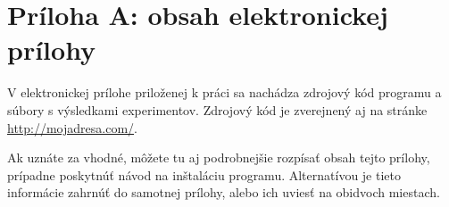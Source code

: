 \chapter*{Príloha A: obsah elektronickej prílohy}

\label{pri:softver} %

V elektronickej prílohe priloženej k práci sa nachádza zdrojový kód
programu a súbory s výsledkami experimentov. Zdrojový kód je
zverejnený aj na stránke \url{http://mojadresa.com/}.

Ak uznáte za vhodné, môžete tu aj podrobnejšie rozpísať obsah tejto
prílohy, prípadne poskytnúť návod na inštaláciu programu. Alternatívou
je tieto informácie zahrnúť do samotnej prílohy, alebo ich uviesť na
obidvoch miestach.
